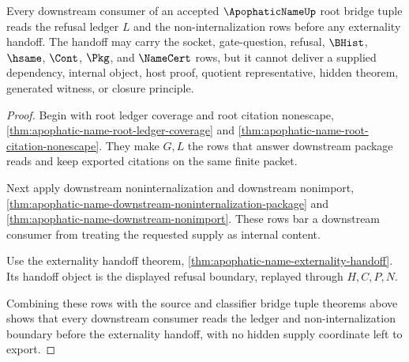 \begin{theorem}
\label{thm:apophatic-name-root-bridge-tuple-ledger}
Every downstream consumer of an accepted $\ApophaticNameUp$ root bridge tuple reads the refusal ledger $L$ and the non-internalization rows before any externality handoff. The handoff may carry the socket, gate-question, refusal, $\BHist$, $\hsame$, $\Cont$, $\Pkg$, and $\NameCert$ rows, but it cannot deliver a supplied dependency, internal object, host proof, quotient representative, hidden theorem, generated witness, or closure principle.
\end{theorem}
\begin{proof}
Begin with root ledger coverage and root citation nonescape, \autoref{thm:apophatic-name-root-ledger-coverage} and \autoref{thm:apophatic-name-root-citation-nonescape}. They make $G,L$ the rows that answer downstream package reads and keep exported citations on the same finite packet.

Next apply downstream noninternalization and downstream nonimport, \autoref{thm:apophatic-name-downstream-noninternalization-package} and \autoref{thm:apophatic-name-downstream-nonimport}. These rows bar a downstream consumer from treating the requested supply as internal content.

Use the externality handoff theorem, \autoref{thm:apophatic-name-externality-handoff}. Its handoff object is the displayed refusal boundary, replayed through $H,C,P,N$.

Combining these rows with the source and classifier bridge tuple theorems above shows that every downstream consumer reads the ledger and non-internalization boundary before the externality handoff, with no hidden supply coordinate left to export.
\end{proof}

